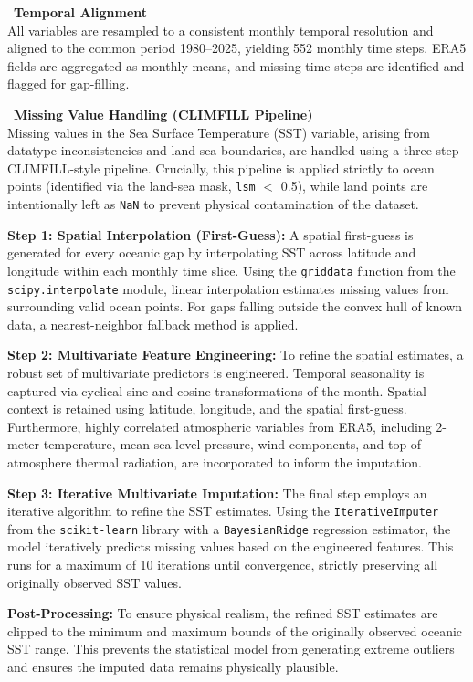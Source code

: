 \noindent\textbullet\ \textbf{Temporal Alignment}\\
All variables are resampled to a consistent monthly temporal resolution and aligned to the common period 1980--2025, yielding 552 monthly time steps. ERA5 fields are aggregated as monthly means, and missing time steps are identified and flagged for gap-filling.

\noindent\textbullet\ \textbf{Missing Value Handling (CLIMFILL Pipeline)}\\
Missing values in the Sea Surface Temperature (SST) variable, arising from datatype inconsistencies and land-sea boundaries, are handled using a three-step CLIMFILL-style pipeline. Crucially, this pipeline is applied strictly to ocean points (identified via the land-sea mask, \texttt{lsm} $<$ 0.5), while land points are intentionally left as \texttt{NaN} to prevent physical contamination of the dataset.

\textbf{Step 1: Spatial Interpolation (First-Guess):} A spatial first-guess is generated for every oceanic gap by interpolating SST across latitude and longitude within each monthly time slice. Using the \texttt{griddata} function from the \texttt{scipy.\allowbreak interpolate} module, linear interpolation estimates missing values from surrounding valid ocean points. For gaps falling outside the convex hull of known data, a nearest-neighbor fallback method is applied.

\textbf{Step 2: Multivariate Feature Engineering:} To refine the spatial estimates, a robust set of multivariate predictors is engineered. Temporal seasonality is captured via cyclical sine and cosine transformations of the month. Spatial context is retained using latitude, longitude, and the spatial first-guess. Furthermore, highly correlated atmospheric variables from ERA5, including 2-meter temperature, mean sea level pressure, wind components, and top-of-atmosphere thermal radiation, are incorporated to inform the imputation.

\textbf{Step 3: Iterative Multivariate Imputation:} The final step employs an iterative algorithm to refine the SST estimates. Using the \texttt{Iterative\allowbreak Imputer} from the \texttt{scikit-learn} library with a \texttt{Bayesian\allowbreak Ridge} regression estimator, the model iteratively predicts missing values based on the engineered features. This runs for a maximum of 10 iterations until convergence, strictly preserving all originally observed SST values.

\textbf{Post-Processing:} To ensure physical realism, the refined SST estimates are clipped to the minimum and maximum bounds of the originally observed oceanic SST range. This prevents the statistical model from generating extreme outliers and ensures the imputed data remains physically plausible.

